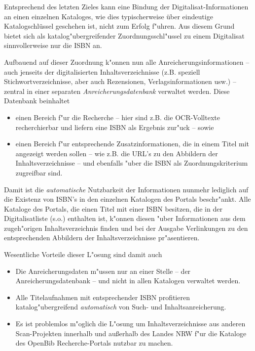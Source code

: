\documentclass[11pt, twoside, a4paper, BCOR8mm, DIV12, bibtotoc,idxtotoc]{scrbook}
\begin{document}
Entsprechend des letzten Zieles kann eine Bindung der
Digitalisat-Informationen an einen einzelnen Kataloges, wie dies
typischerweise über eindeutige Katalogschlüssel geschehen ist, nicht
zum Erfolg f"uhren.  Aus diesem Grund bietet sich als
katalog"ubergreifender Zuordnungsschl"ussel zu einem Digitalisat
sinnvollerweise nur die ISBN an.

Aufbauend auf dieser Zuordnung k"onnen nun alle
Anreicherungsinformationen -- auch jenseits der digitalisierten
Inhaltsverzeichnisse (z.B. speziell Stichwortverzeichnisse, aber auch
Rezensionen, Verlagsinformationen usw.) -- zentral in einer separaten
\emph{Anreicherungsdatenbank} verwaltet werden. Diese Datenbank beinhaltet

\begin{itemize}
\item einen Bereich f"ur die Recherche -- hier sind z.B. die
  OCR-Volltexte recherchierbar und liefern eine ISBN als Ergebnis
  zur"uck -- sowie
\item einen Bereich f"ur entsprechende Zusatzinformationen, die in
  einem Titel mit angezeigt werden sollen -- wie z.B. die URL's zu den
  Abbildern der Inhaltsverzeichnisse -- und ebenfalls "uber die ISBN
  als Zuordnungskriterium zugreifbar sind.
\end{itemize}


Damit ist die \emph{automatische} Nutzbarkeit der Informationen nunmehr
lediglich auf die Existenz von ISBN's in den einzelnen Katalogen des
Portals beschr"ankt. Alle Kataloge des Portals, die einen Titel mit einer
ISBN besitzen, die in der Digitalisatliste (s.o.) enthalten ist,
k"onnen diesen "uber Informationen aus dem zugeh"origen
Inhaltsverzeichnis finden und bei der Ausgabe Verlinkungen zu den
entsprechenden Abbildern der Inhaltsverzeichnisse pr"asentieren.

Wesentliche Vorteile dieser L"osung sind damit auch

\begin{itemize}
\item Die Anreicherungsdaten m"ussen nur an einer Stelle -- der
  Anreicherungsdatenbank -- und nicht in allen Katalogen verwaltet werden.
\item Alle Titelaufnahmen mit entsprechender ISBN profitieren
  katalog"ubergreifend \emph{automatisch} von Such- und
  Inhaltsanreicherung.
\item Es ist problemlos m"oglich die L"osung um Inhaltsverzeichnisse
  aus anderen Scan-Projekten innerhalb und außerhalb des Landes NRW
  f"ur die Kataloge des OpenBib Recherche-Portals nutzbar zu machen.
\end{itemize}
\end{document}
